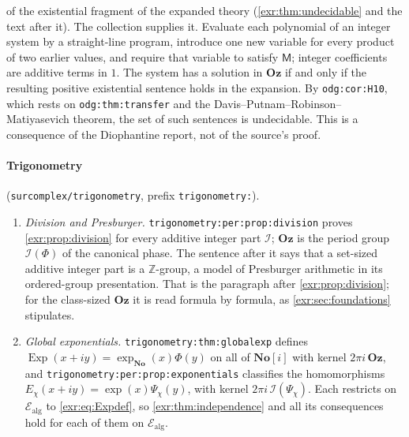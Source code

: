 \documentclass[11pt,letterpaper]{article}
\numberwithin{equation}{section}
\theoremstyle{definition}
\theoremstyle{remark}
\newcommand{\No}{\mathbf{No}}
\newcommand{\Oz}{\mathbf{Oz}}
\newcommand{\SC}{\mathbf{No}[i]}
\newcommand{\Z}{\mathbb Z}
\newcommand{\Ealg}{\mathcal E_{\mathrm{alg}}}
\newcommand{\Exp}{\operatorname{Exp}}
\newcommand{\rpath}[1]{\nolinkurl{#1}}%
\newcommand{\lbl}[1]{\nolinkurl{#1}}%
\begin{document}
\begin{enumerate}[leftmargin=*,itemsep=3pt]
of the existential fragment of the expanded theory
(\cref{exr:thm:undecidable} and the text after it). The collection supplies
it. Evaluate each polynomial of an integer system by a straight-line
program, introduce one new variable for every product of two earlier
values, and require that variable to satisfy $\mathsf M$; integer
coefficients are additive terms in $1$. The system has a solution in $\Oz$
if and only if the resulting positive existential sentence holds in the
expansion. By
\lbl{odg:cor:H10}, which rests on \lbl{odg:thm:transfer} and the
Davis--Putnam--Robinson--Matiyasevich theorem, the set of such sentences is
undecidable. This is a consequence of the Diophantine report, not of the
source's proof.
\end{enumerate}

\paragraph{Trigonometry}
(\rpath{surcomplex/trigonometry}, prefix \texttt{trigonometry:}).
\begin{enumerate}[leftmargin=*,itemsep=3pt]
\item \emph{Division and Presburger.} \lbl{trigonometry:per:prop:division}
proves \cref{exr:prop:division} for every additive integer part $\mathcal I$; $\Oz$ is
the period group $\mathcal I(\Phi)$ of the canonical phase. The sentence after it
says that a set-sized additive integer part is a $\Z$-group, a model of
Presburger arithmetic in its ordered-group presentation. That is the
paragraph after \cref{exr:prop:division}; for the class-sized $\Oz$ it is read
formula by formula, as \cref{exr:sec:foundations} stipulates.
\item \emph{Global exponentials.} \lbl{trigonometry:thm:globalexp} defines
$\Exp(x+iy)=\exp_{\No}(x)\Phi(y)$ on all of $\SC$ with kernel $2\pi i\,\Oz$,
and \lbl{trigonometry:per:prop:exponentials} classifies the homomorphisms
$E_\chi(x+iy)=\exp(x)\Psi_\chi(y)$, with kernel $2\pi i\,\mathcal I(\Psi_\chi)$. Each
restricts on $\Ealg$ to \eqref{exr:eq:Expdef}, so \cref{exr:thm:independence}
and all its consequences hold for each of them on $\Ealg$.
\end{enumerate}
\end{document}
